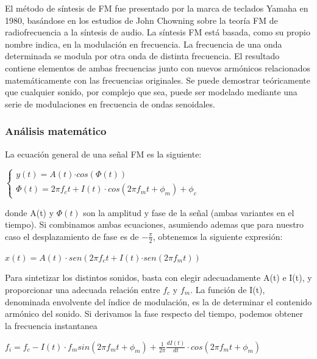 \documentclass[../ASSD_TP2.tex]{subfiles}
\begin{document}
El método de síntesis de FM fue presentado por la marca de teclados
Yamaha en 1980, basándose en los estudios de John Chowning sobre la
teoría FM de radiofrecuencia a la síntesis de audio. La síntesis FM
está basada, como su propio nombre indica, en la modulación en frecuencia.
La frecuencia de una onda determinada se modula por otra onda de distinta
frecuencia. El resultado contiene elementos de ambas frecuencias junto
con nuevos armónicos relacionados matemáticamente con las frecuencias
originales. Se puede demostrar teóricamente que cualquier sonido,
por complejo que sea, puede ser modelado mediante una serie de modulaciones
en frecuencia de ondas senoidales.

\subsubsection{Análisis matemático}

La ecuación general de una señal FM es la siguiente:
\begin{center}
{\large{}$\begin{cases}
y(t)=A(t)\text{·}cos(\Phi(t))\\
\Phi(t)=2\pi f_{c}t+I(t)\cdot cos(2\pi f_{m}t+\phi_{m})+\phi_{c}
\end{cases}$}{\large\par}
\par\end{center}

donde A(t) y $\Phi(t)$ son la amplitud y fase de la señal (ambas
variantes en el tiempo). Si combinamos ambas ecuaciones, asumiendo
ademas que para nuestro caso el desplazamiento de fase es de $-\frac{\pi}{2}$,
obtenemos la siguiente expresión:
\begin{center}
{\large{}$x(t)=A(t)\cdot sen(2\pi f_{c}t+I(t)\text{·}sen(2\pi f_{m}t))$}{\large\par}
\par\end{center}

Para sintetizar los distintos sonidos, basta con elegir adecuadamente
A(t) e I(t), y proporcionar una adecuada relación entre $f_{c}$ y
$f_{m}$. La función de I(t), denominada envolvente del índice de
modulación, es la de determinar el contenido armónico del sonido.
Si derivamos la fase respecto del tiempo, podemos obtener la frecuencia
instantanea 
\begin{center}
{\large{}$f_{i}=f_{c}-I(t)\cdot f_{m}sin(2\pi f_{m}t+\phi_{m})+\frac{1}{2\pi}\frac{dI(t)}{dt}\cdot cos(2\pi f_{m}t+\phi_{m})$}{\large\par}
\par\end{center}
\end{document}

